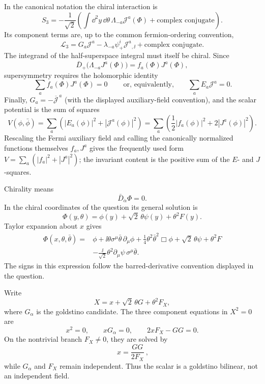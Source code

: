 \begin{enumerate}
  In the canonical notation the chiral interaction is
  \[
    S_3=-\frac1{\sqrt2}\left(
       \int \dd^2y\,\dd\theta\,\Lambda_{-a}\mathcal J^a(\Phi)
       +\text{complex conjugate}\right).
  \]
  Its component terms are, up to the common fermion-ordering convention,
  \[
    \mathcal L_3
      =G_a\mathcal J^a
       -\lambda_{-a}\psi_+^i\mathcal J^a{}_{,\ii}
       +\text{complex conjugate}.
  \]
  The integrand of the half-superspace integral must itself be chiral.  Since
  \[
    \bar D_+\bigl(\Lambda_{-a}J^a(\Phi)\bigr)
       =f_a(\Phi)J^a(\Phi),
  \]
  supersymmetry requires the holomorphic identity
  \[
    \boxed{\ \sum_a f_a(\Phi)J^a(\Phi)=0\ }
    \qquad\text{or, equivalently,}\qquad
    \sum_aE_a\mathcal J^a=0.
  \]
  Finally, \(G_a=-\overline{\mathcal J}^{\,a}\) (with the displayed
  auxiliary-field convention), and the scalar potential is the sum of
  squares
  \[
    V(\phi,\bar\phi)
      =\sum_a\left(|E_a(\phi)|^2+|\mathcal J^a(\phi)|^2\right)
      =\sum_a\left(\frac12|f_a(\phi)|^2+2|J^a(\phi)|^2\right).
  \]
  Rescaling the Fermi auxiliary field and calling the canonically normalized
  functions themselves \(f_a,J^a\) gives the frequently used form
  \(V=\sum_a(|f_a|^2+|J^a|^2)\); the invariant content is the positive sum of
  the \(E\)- and \(J\)-squares.

  Chirality means
  \[
    \bar D_{\dot\alpha}\Phi=0.
  \]
  In the chiral coordinates of the question its general solution is
  \[
    \Phi(y,\theta)=\phi(y)+\sqrt2\,\theta\psi(y)+\theta^2F(y).
  \]
  Taylor expansion about \(x\) gives
  \[
  \begin{split}
    \Phi(x,\theta,\bar\theta)={}&\phi
      +\ii\theta\sigma^\mu\bar\theta\,\partial_\mu\phi
      +\frac14\theta^2\bar\theta^2\Box\phi
      +\sqrt2\,\theta\psi+\theta^2F\\
      &-\frac{\ii}{\sqrt2}\theta^2
        \partial_\mu\psi\,\sigma^\mu\bar\theta .
  \end{split}
  \]
  The signs in this expression follow the barred-derivative convention
  displayed in the question.

  Write
  \[
    X=x+\sqrt2\,\theta G+\theta^2F_X,
  \]
  where \(G_\alpha\) is the goldstino candidate.  The three component
  equations in \(X^2=0\) are
  \[
    x^2=0,\qquad xG_\alpha=0,\qquad 2xF_X-GG=0.
  \]
  On the nontrivial branch \(F_X\ne0\), they are solved by
  \[
    \boxed{\ x=\frac{GG}{2F_X}\ },
  \]
  while \(G_\alpha\) and \(F_X\) remain independent.  Thus the scalar is a
  goldstino bilinear, not an independent field.


\end{enumerate}
